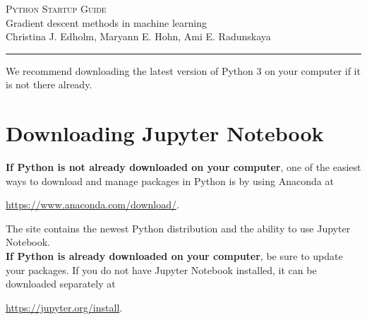 \documentclass[addpoints]{exam}
\def\course{Gradient descent methods in machine learning}
\def\docTitle{Python Startup Guide}
\def\profName{Christina J. Edholm, Maryann E. Hohn, Ami E. Radunskaya}
\begin{document}
{\center \textsc{\Large \docTitle}\\
	\large\course\\
	\profName\\
	\vspace*{1em}
	\hrule
\vspace*{2em}}

We recommend downloading the latest version of Python 3 on your computer if it is not there already.

\section{Downloading Jupyter Notebook}

\textbf{If Python is not already downloaded on your computer}, one of the easiest ways to download and manage packages in Python is by using Anaconda at
\begin{center}
    \href{https://www.anaconda.com/download/}{https://www.anaconda.com/download/}.
\end{center}

The site contains the newest Python distribution and the ability to use Jupyter Notebook.\\

\textbf{If Python is already downloaded on your computer}, be sure to update your packages. If you do not have Jupyter Notebook installed, it can be downloaded separately at
\begin{center}
    \href{https://jupyter.org/install}{https://jupyter.org/install}.
\end{center}
\end{document}
